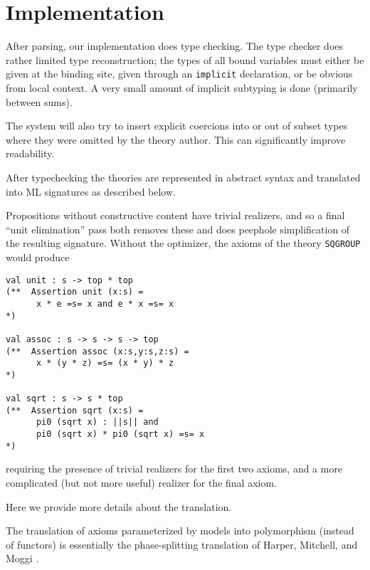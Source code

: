 
\section{Implementation}
\label{sec:implementation}

After parsing, our implementation does type checking.  The type
checker does rather limited type reconstruction; the types of all
bound variables must either be given at the binding site, given
through an \Verb|implicit| declaration, or be obvious from local
context.  A very small amount of implicit subtyping is done (primarily
between sums).  

The system will also try to insert explicit coercions into or out of
subset types where they were omitted by the theory author.  This can
significantly improve readability.  

After typechecking the theories are represented in abstract syntax and
translated into ML signatures as described below.  

Propositions without constructive content have trivial realizers, and
so a final ``unit elimination'' pass both removes these and does 
peephole simplification of the resulting signature.   Without the optimizer,
the axioms of the theory \Verb|SQGROUP| would produce
\begin{Verbatim}
val unit : s -> top * top
(**  Assertion unit (x:s) =  
      x * e =s= x and e * x =s= x
*)
   
val assoc : s -> s -> s -> top
(**  Assertion assoc (x:s,y:s,z:s) =
      x * (y * z) =s= (x * y) * z
*)
   
val sqrt : s -> s * top
(**  Assertion sqrt (x:s) =  
      pi0 (sqrt x) : ||s|| and 
      pi0 (sqrt x) * pi0 (sqrt x) =s= x
*)
\end{Verbatim}
requiring the presence of trivial realizers for the first two axioms,
and a more complicated (but not more useful) realizer for the final
axiom.


Here we provide more details about the translation.


The translation of axioms parameterized by models into polymorphism
(instead of functors) is essentially the phase-splitting translation
of Harper, Mitchell, and Moggi \cite{harper+:popl90}.

